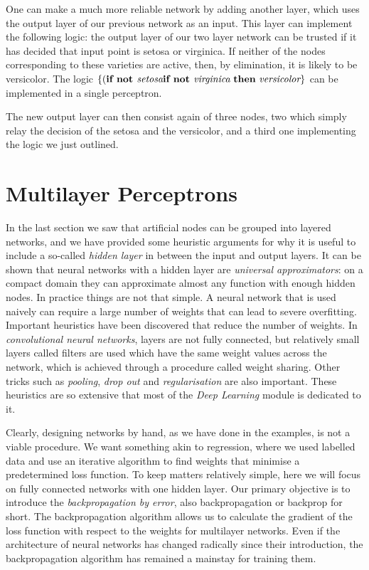   One can make a much more reliable network by adding another layer, which uses the output layer of our previous network as an input. This layer can implement
  the following logic: the output layer of our two layer network can be trusted if it has decided that input point is setosa or virginica. If neither
  of the nodes corresponding to these varieties are active, then, by elimination, it is likely to be versicolor. The logic
  $\{ (\mbox{{\bf if not }} \emph{setosa} \mbox{{\bf if not }} \emph{virginica} \mbox{ {\bf then} } \emph{versicolor} \}$ can be implemented in a single perceptron.

  The new output layer can then consist again of three nodes, two which simply relay the decision of the setosa and the versicolor, and a third one implementing the logic we just outlined.

      
    \section{Multilayer Perceptrons}
    \label{sec-mlp}
    In the last section we saw that artificial nodes can be grouped into layered networks, and we have provided some heuristic arguments for why it is useful
    to include a so-called \emph{hidden layer} in between the input and output layers. It can be shown that neural networks with a hidden layer are
    \emph{universal approximators}: on a compact domain they can approximate almost any function with enough hidden nodes. In practice things are not that simple.
    A neural network that is used naively can require a large number of weights that can lead to severe overfitting. Important heuristics have been discovered
    that reduce the number of weights. In \emph{convolutional neural networks}, layers are not fully connected, but relatively small layers called filters are used
    which have the same weight values across the network, which is achieved through a procedure called weight sharing. Other tricks such as \emph{pooling}, \emph{drop out}
    and \emph{regularisation} are also important. These heuristics are so extensive that most of the  \emph{Deep Learning} module is dedicated to it.

    Clearly, designing networks by hand, as we have done in the examples, is not a viable procedure. We want something akin to regression, where we used labelled data
    and use an iterative algorithm to find weights that minimise a predetermined loss function.
    To keep matters relatively simple, here we will focus on fully connected networks with one hidden layer. Our primary objective is to introduce the \emph{backpropagation by
      error}, also backpropagation or backprop for short. The backpropagation algorithm allows us to calculate the gradient of the loss function with respect to the weights
    for multilayer networks. Even if the architecture of neural networks has changed radically since their introduction, the backpropagation algorithm has remained a mainstay
    for training them.

